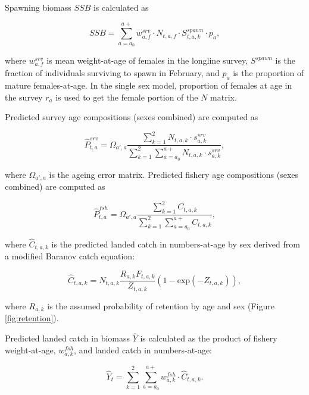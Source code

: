 \documentclass[
]{article}
\begin{document}
Spawning biomass \(SSB\) is calculated as

\[
\begin{equation}
SSB=\sum_{a=a_0}^{a+} w_{a,f}^{srv} \cdot N_{t,a,f} \cdot S_{t,a,k}^{spawn} \cdot p_a,
\label{eq:ssb}
\end{equation}
\]

where \(w_{a,f}^{srv}\) is mean weight-at-age of females in the longline survey, \(S^{spawn}\) is the fraction of individuals surviving to spawn in February, and \(p_a\) is the proportion of mature females-at-age. In the single sex model, proportion of females at age in the survey \(r_a\) is used to get the female portion of the \(N\) matrix.

Predicted survey age compositions (sexes combined) are computed as

\[
\begin{equation}
\hat{P}_{t,a}^{srv}=\Omega_{a',a}\frac{\sum_{k=1}^{2}N_{t,a,k} \cdot s_{a,k}^{srv}}{\sum_{k=1}^{2}\sum_{a=a_0}^{a+} N_{t,a,k} \cdot s_{a,k}^{srv}},
\label{eq:predsrvage}
\end{equation}
\]

where \(\Omega_{a',a}\) is the ageing error matrix. Predicted fishery age compositions (sexes combined) are computed as

\[
\begin{equation}
\hat{P}_{t,a}^{fsh}=\Omega_{a',a}\frac{\sum_{k=1}^{2}C_{t,a,k}}{\sum_{k=1}^{2}\sum_{a=a_0}^{a+} C_{t,a,k}},
\label{eq:predfshage}
\end{equation}
\]

where \(\hat{C}_{t,a,k}\) is the predicted landed catch in numbers-at-age by sex derived from a modified Baranov catch equation:

\[
\begin{equation}
\hat{C}_{t,a,k}=N_{t,a,k}\frac{R_{a,k}F_{t,a,k}}{Z_{t,a,k}}(1-\mbox{exp}(-Z_{t,a,k})),
\label{eq:landed}
\end{equation}
\]

where \(R_{a,k}\) is the assumed probability of retention by age and sex (Figure \ref{fig:retention}).

Predicted landed catch in biomass \(\hat{Y}\) is calculated as the product of fishery weight-at-age, \(w_{a,k}^{fsh}\), and landed catch in numbers-at-age:

\[
\begin{equation}
\hat{Y}_t=\sum_{k=1}^{2}\sum_{a=a_0}^{a+} w_{a,k}^{fsh} \cdot \hat{C}_{t,a,k}.
\label{eq:yield}
\end{equation}
\]
\end{document}

